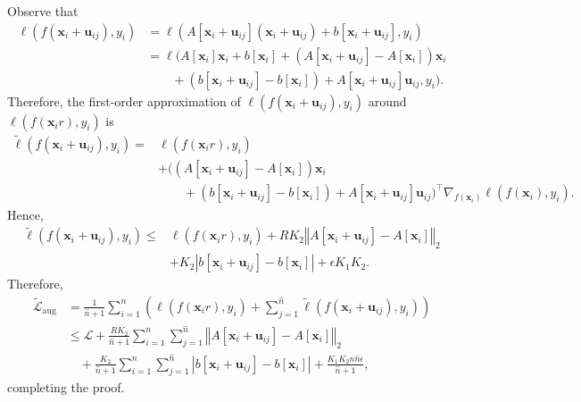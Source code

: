 \begin{tproof}
    Observe that
    \begin{align*}
        \ell\left(f\left(\mathbf{x}_i+\mathbf{u}_{ij}\right),y_i\right)&=\ell\left(A\left[\mathbf{x}_i+\mathbf{u}_{ij}\right]\left(\mathbf{x}_i+\mathbf{u}_{ij}\right)+b\left[\mathbf{x}_i+\mathbf{u}_{ij}\right],y_i\right)\\&=\ell\big(A\left[\mathbf{x}_i\right]\mathbf{x}_i+b\left[\mathbf{x}_i\right]+\left(A\left[\mathbf{x}_i+\mathbf{u}_{ij}\right]-A\left[\mathbf{x}_i\right]\right)\mathbf{x}_i\\&\qquad+\left(b\left[\mathbf{x}_i+\mathbf{u}_{ij}\right]-b\left[\mathbf{x}_i\right]\right)+A\left[\mathbf{x}_i+\mathbf{u}_{ij}\right]\mathbf{u}_{ij},y_i\big).
    \end{align*}
    Therefore, the first-order approximation of $\ell\left(f\left(\mathbf{x}_i+\mathbf{u}_{ij}\right),y_i\right)$ around $\ell\left(f\left(\mathbf{x}_ir\right),y_i\right)$ is 
    \begin{align*}
        \tilde{\ell}\left(f\left(\mathbf{x}_i+\mathbf{u}_{ij}\right),y_i\right)=&\ell\left(f\left(\mathbf{x}_ir\right),y_i\right)\\&+\big(\left(A\left[\mathbf{x}_i+\mathbf{u}_{ij}\right]-A\left[\mathbf{x}_i\right]\right)\mathbf{x}_i\\&\qquad+\left(b\left[\mathbf{x}_i+\mathbf{u}_{ij}\right]-b\left[\mathbf{x}_i\right]\right)+A\left[\mathbf{x}_i+\mathbf{u}_{ij}\right]\mathbf{u}_{ij}\big)^\top\nabla_{f\left(\mathbf{x}_i\right)}\ell\left(f\left(\mathbf{x}_i\right),y_i\right).
    \end{align*}
    Hence, 
    \begin{align*}
        \tilde{\ell}\left(f\left(\mathbf{x}_i+\mathbf{u}_{ij}\right),y_i\right)\leq&\ell\left(f\left(\mathbf{x}_ir\right),y_i\right)+RK_2\left\Vert A\left[\mathbf{x}_i+\mathbf{u}_{ij}\right]-A\left[\mathbf{x}_i\right]\right\Vert_2\\&+K_2\left\vert b\left[\mathbf{x}_i+\mathbf{u}_{ij}\right]-b\left[\mathbf{x}_i\right]\right\vert+\epsilon K_1K_2.
    \end{align*}
    Therefore, 
    \begin{align*}
        \tilde{\mathcal{L}}_{\text{aug}}&=\frac{1}{\hat{n}+1}\sum_{i=1}^n\left(\ell\left(f\left(\mathbf{x}_ir\right),y_i\right)+\sum_{j=1}^{\hat{n}}\tilde{\ell}\left(f\left(\mathbf{x}_i+\mathbf{u}_{ij}\right),y_i\right)\right)\\&\leq\mathcal{L}+\frac{RK_2}{\hat{n}+1}\sum_{i=1}^n\sum_{j=1}^{\hat{n}}\left\Vert A\left[\mathbf{x}_i+\mathbf{u}_{ij}\right]-A\left[\mathbf{x}_i\right]\right\Vert_2\\&\quad+\frac{K_2}{\hat{n}+1}\sum_{i=1}^n\sum_{j=1}^{\hat{n}}\left\vert b\left[\mathbf{x}_i+\mathbf{u}_{ij}\right]-b\left[\mathbf{x}_i\right]\right\vert+\frac{K_1K_2n\hat{n}\epsilon}{\hat{n}+1},
    \end{align*}
    completing the proof.
\end{tproof}


